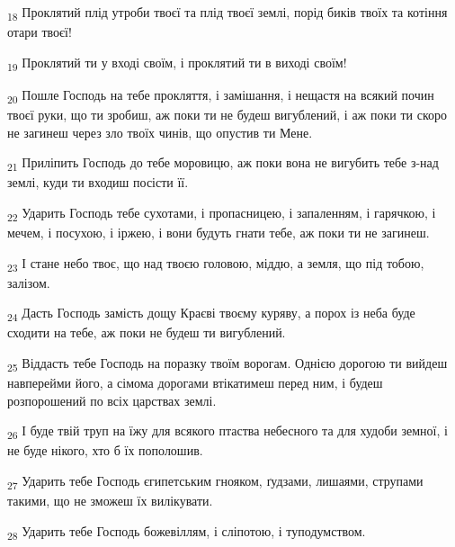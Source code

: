\begin{tcolorbox}
\textsubscript{18} Проклятий плід утроби твоєї та плід твоєї землі, порід биків твоїх та котіння отари твоєї!
\end{tcolorbox}
\begin{tcolorbox}
\textsubscript{19} Проклятий ти у вході своїм, і проклятий ти в виході своїм!
\end{tcolorbox}
\begin{tcolorbox}
\textsubscript{20} Пошле Господь на тебе прокляття, і замішання, і нещастя на всякий почин твоєї руки, що ти зробиш, аж поки ти не будеш вигублений, і аж поки ти скоро не загинеш через зло твоїх чинів, що опустив ти Мене.
\end{tcolorbox}
\begin{tcolorbox}
\textsubscript{21} Приліпить Господь до тебе моровицю, аж поки вона не вигубить тебе з-над землі, куди ти входиш посісти її.
\end{tcolorbox}
\begin{tcolorbox}
\textsubscript{22} Ударить Господь тебе сухотами, і пропасницею, і запаленням, і гарячкою, і мечем, і посухою, і іржею, і вони будуть гнати тебе, аж поки ти не загинеш.
\end{tcolorbox}
\begin{tcolorbox}
\textsubscript{23} І стане небо твоє, що над твоєю головою, міддю, а земля, що під тобою, залізом.
\end{tcolorbox}
\begin{tcolorbox}
\textsubscript{24} Дасть Господь замість дощу Краєві твоєму куряву, а порох із неба буде сходити на тебе, аж поки не будеш ти вигублений.
\end{tcolorbox}
\begin{tcolorbox}
\textsubscript{25} Віддасть тебе Господь на поразку твоїм ворогам. Однією дорогою ти вийдеш навперейми його, а сімома дорогами втікатимеш перед ним, і будеш розпорошений по всіх царствах землі.
\end{tcolorbox}
\begin{tcolorbox}
\textsubscript{26} І буде твій труп на їжу для всякого птаства небесного та для худоби земної, і не буде нікого, хто б їх пополошив.
\end{tcolorbox}
\begin{tcolorbox}
\textsubscript{27} Ударить тебе Господь єгипетським гнояком, ґудзами, лишаями, струпами такими, що не зможеш їх вилікувати.
\end{tcolorbox}
\begin{tcolorbox}
\textsubscript{28} Ударить тебе Господь божевіллям, і сліпотою, і туподумством.
\end{tcolorbox}
